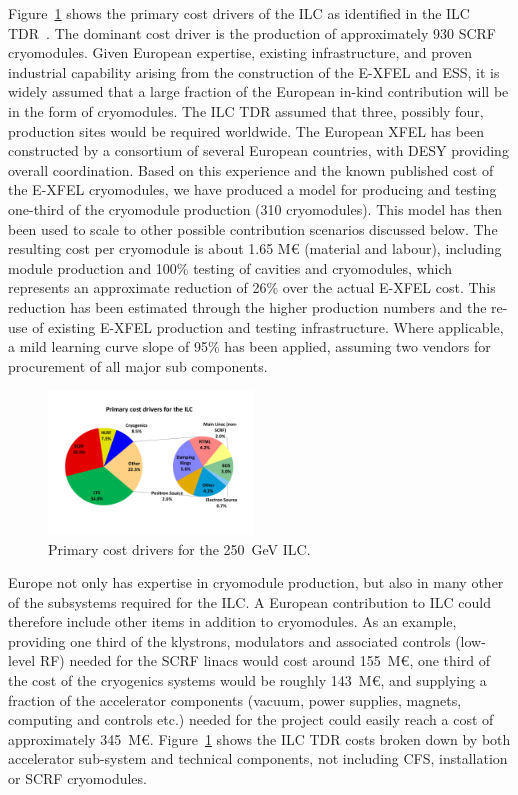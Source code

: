 \documentclass[%
 reprint,
 floatfix,
 amsmath,amssymb,
 aps,
]{revtex4-1}
\begin{document}
Figure~\ref{fig:constructionmodel:ILCPrimaryCostDrivers} shows the primary cost drivers of the ILC as identified in the ILC
TDR~\cite{Adolphsen:2013kya}. The dominant cost driver is the production of approximately 930 SCRF cryomodules. Given European expertise, 
existing infrastructure, and proven industrial capability arising from the construction 
of the E-XFEL and ESS, it is widely assumed that a large fraction of the European in-kind contribution 
will be in the form of cryomodules. The ILC TDR assumed that three, possibly four, production sites 
would be required worldwide. 
The European XFEL has been constructed by a consortium of several European
countries, with DESY providing overall coordination. Based on this experience 
and the known published cost of the E-XFEL cryomodules, we have produced a model 
for producing and testing one-third of the cryomodule production (310 
cryomodules). This model has then been used to scale to other possible 
contribution scenarios discussed below. The resulting cost per cryomodule is about 1.65 M\euro{} (material and labour), including module production and 100\% 
testing of cavities and cryomodules, which represents an approximate reduction 
of 26\% over the actual E-XFEL cost. This reduction has been estimated through 
the higher production numbers and the re-use of existing E-XFEL production and 
testing infrastructure.  Where applicable, a mild learning curve slope of 95\% 
has been applied, assuming two vendors for procurement of all major sub 
components.

\begin{figure}[htbp]
\begin{center}
\includegraphics[width=0.4825\textwidth]{figures/eap-chp3-ilccostdrivers.pdf}
 \caption{\label{fig:constructionmodel:ILCPrimaryCostDrivers} Primary cost drivers for the 250~GeV ILC.}
\end{center}
\end{figure}

Europe not only has expertise in cryomodule production, but also in many other 
of the subsystems required for the ILC. A European contribution to ILC could 
therefore include other items in addition to cryomodules. As an example, providing 
one third of the klystrons, modulators and associated controls (low-level RF) 
needed for the SCRF linacs would cost around 155~M\euro{}, one third of the cost of 
the cryogenics systems would be roughly 143~M\euro{}, and supplying a fraction of the 
accelerator components (vacuum, power supplies, magnets, computing and controls 
etc.) needed for the project could easily reach a cost of approximately 345~M\euro{}. 
Figure~\ref{fig:constructionmodel:ILCPrimaryCostDrivers} shows the ILC TDR costs broken down by both accelerator sub-system and 
technical components, not including CFS, installation or SCRF cryomodules.
\end{document}

